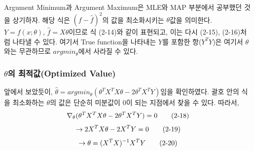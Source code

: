 \documentclass[a4paper]{oblivoir}
\begin{document}
\indent Argument Minimum과 Argument Maximum은 MLE와 MAP 부분에서 공부했던 것을 상기하자. 해당 식은 $(f - \hat{f})^{2}$의 값을 최소화시키는 $\theta$값을 의미한다. $Y = f(x;\theta)$, $\hat{f} = X\theta$이므로 식 (2-14)와 같이 표현되고, 이는 다시 (2-15), (2-16)처럼 나타낼 수 있다. 여기서 True function을 나타내는 $Y$를 포함한 항($Y^{T}Y$)은 여기서 $\theta$ 와는 무관하므로 $argmin_{\theta}$에서 사라질 수 있다.

\subsubsection{\texorpdfstring{$\theta$}{Lg}의 최적값(Optimized Value)}
앞에서 보았듯이, $\hat{\theta} = argmin_{\theta}(\theta^{T}X^{T}X\theta - 2\theta^{T}X^{T}Y)$임을 확인하였다. 괄호 안의 식을 최소화하는 $\theta$의 값은 단순히 미분값이 0이 되는 지점에서 찾을 수 있다. 따라서,
\begin{equation} 
\nabla_{\theta}(\theta^{T}X^{T}X\theta - 2 \theta^{T}X^{T}Y) = 0						\tag{2-18}\\
\end{equation}
\begin{equation} 
\to 2 X^{T}X\theta - 2 X^{T}Y = 0														\tag{2-19}\\
\end{equation}
\begin{equation}
\to \theta = (X^{T}X)^{-1}X^{T}Y														\tag{2-20}\\
\end{equation}
\end{document}
